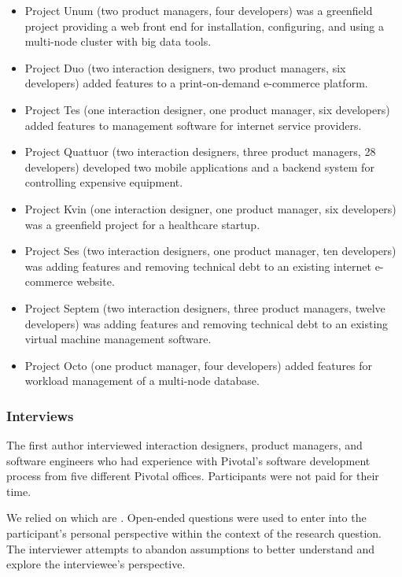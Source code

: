 \begin{itemize}
\item Project Unum (two product managers, four developers) was a greenfield project providing a web front end for installation, configuring, and using a multi-node cluster with big data tools. 
\item Project Duo (two interaction designers, two product managers, six developers) added features to a print-on-demand e-commerce platform. 
\item Project Tes (one interaction designer, one product manager, six developers) added features to management software for internet service providers.
\item Project Quattuor (two interaction designers, three product managers, 28 developers) developed two mobile applications and a backend system for controlling expensive equipment.
\item Project Kvin (one interaction designer, one product manager, six developers) was a greenfield project for a healthcare startup. 
\item Project Ses (two interaction designers, one product manager, ten developers) was adding features and removing technical debt to an existing internet e-commerce website.
\item Project Septem (two interaction designers, three product managers, twelve developers) was adding features and removing technical debt to an existing virtual machine management software.
\item Project Octo (one product manager, four developers) added features for workload management of a multi-node database.
\end{itemize}
\subsubsection{Interviews}
The first author interviewed \numberOfInterviews{} interaction designers, product managers, and software engineers who had experience with Pivotal's software development process from five different Pivotal offices. Participants were not paid for their time.

We relied on  which are  \cite{Charmaz}. Open-ended questions were used to enter into the participant's personal perspective within the context of the research question. The interviewer attempts to abandon assumptions to better understand and explore the interviewee's perspective. 

